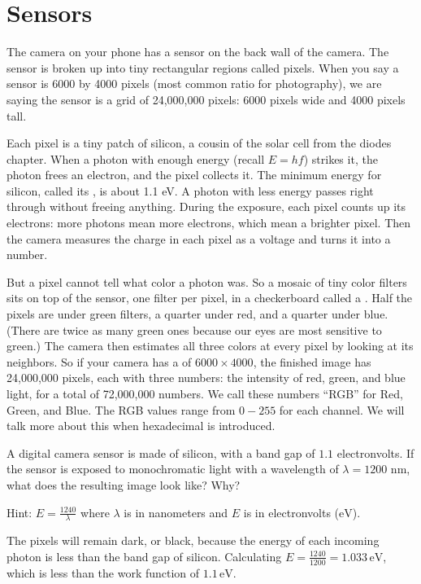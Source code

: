 \section{Sensors}

The camera on your phone has a sensor on the back wall of the
camera. The sensor is broken up into tiny rectangular regions called
pixels. When you say a sensor is 6000 by 4000 pixels (most common ratio for photography), we are saying
the sensor is a grid of 24,000,000 pixels: 6000 pixels wide and
4000 pixels tall.


Each pixel is a tiny patch of silicon, a cousin of the solar cell from the
diodes chapter. When a photon with enough energy (recall $E = hf$) strikes
it, the photon frees an electron, and the pixel collects it. The minimum
energy for silicon, called its , is about 1.1 eV. A
photon with less energy passes right through without freeing anything.
During the exposure, each pixel counts up its electrons: more photons
mean more electrons, which mean a brighter pixel. Then the camera measures
the charge in each pixel as a voltage and turns it into a number.

But a pixel cannot tell what color a photon was. So a mosaic of tiny color
filters sits on top of the sensor, one filter per pixel, in a checkerboard
called a . Half the pixels are under green filters,
a quarter under red, and a quarter under blue. (There are twice as many
green ones because our eyes are most sensitive to green.) The camera then
estimates all three colors at every pixel by looking at its neighbors.
So if your camera has a  of
$6000 \times 4000$, the finished image has 24,000,000 pixels, each with
three numbers: the intensity of red, green, and blue light, for a total of
72,000,000 numbers. We call these numbers ``RGB'' for Red, Green, and
Blue. The RGB values range from $0-255$ for each channel. We will talk more about this when hexadecimal is introduced.

\begin{Exercise}[title={Camera Pixels}, label={ex:photon_camera}]
A digital camera sensor is made of silicon, with a band gap of $1.1$ electronvolts. If the sensor is exposed to monochromatic light with a wavelength of $\lambda = 1200\text{ nm}$, what does the resulting image look like? Why?

Hint: $E = \frac{1240}{\lambda}$ where $\lambda$ is in nanometers and $E$ is in electronvolts ($\textrm{eV}$).
\end{Exercise}
\begin{Answer}[ref={ex:photon_camera}]

The pixels will remain dark, or black, because the energy of each incoming photon is less than the band gap of silicon. Calculating $E = \frac{1240}{1200} = 1.033 \, \textrm{eV}$, which is less than the work function of $1.1 \, \textrm{eV}$.

\end{Answer}
